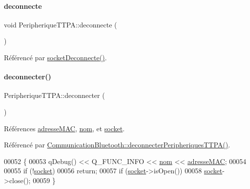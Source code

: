 \paragraph{\texorpdfstring{deconnecte}{deconnecte}}
{\footnotesize\ttfamily void Peripherique\+T\+T\+P\+A\+::deconnecte (\begin{DoxyParamCaption}{ }\end{DoxyParamCaption})\hspace{0.3cm}{\ttfamily [signal]}}



Référencé par \hyperlink{class_peripherique_t_t_p_a_adb04c45864ea56a80a0716cde0a31856}{socket\+Deconnecte()}.

\mbox{\label{class_peripherique_t_t_p_a_a23bd4f409e6763022807d5b278464328}} 
\paragraph{\texorpdfstring{deconnecter()}{deconnecter()}}
{\footnotesize\ttfamily Peripherique\+T\+T\+P\+A\+::deconnecter (\begin{DoxyParamCaption}{ }\end{DoxyParamCaption})}



Références \hyperlink{class_peripherique_t_t_p_a_a444063230c83cf81eff8a3a55736f2cf}{adresse\+M\+AC}, \hyperlink{class_peripherique_t_t_p_a_afafe3566b4b5357819811218b9a4244f}{nom}, et \hyperlink{class_peripherique_t_t_p_a_ab66f30984a7f9fa17fd28391efe968a9}{socket}.



Référencé par \hyperlink{class_communication_bluetooth_aacfffa47d72f3ab5ab554001d5f38fd1}{Communication\+Bluetooth\+::deconnecter\+Peripheriques\+T\+T\+P\+A()}.


\begin{DoxyCode}
00052 \{
00053     qDebug() << Q\_FUNC\_INFO << \hyperlink{class_peripherique_t_t_p_a_afafe3566b4b5357819811218b9a4244f}{nom} << \hyperlink{class_peripherique_t_t_p_a_a444063230c83cf81eff8a3a55736f2cf}{adresseMAC};
00054 
00055     \textcolor{keywordflow}{if} (!\hyperlink{class_peripherique_t_t_p_a_ab66f30984a7f9fa17fd28391efe968a9}{socket})
00056         \textcolor{keywordflow}{return};
00057     \textcolor{keywordflow}{if} (\hyperlink{class_peripherique_t_t_p_a_ab66f30984a7f9fa17fd28391efe968a9}{socket}->isOpen())
00058         \hyperlink{class_peripherique_t_t_p_a_ab66f30984a7f9fa17fd28391efe968a9}{socket}->close();
00059 \}
\end{DoxyCode}
\mbox{\label{class_peripherique_t_t_p_a_a529048ac8be73560038bbeee0047b634}} 
